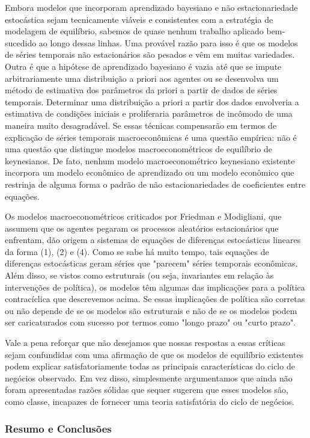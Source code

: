 \documentclass[a4paper,12pt]{article}[abntex2]
\begin{document}
Embora modelos que incorporam aprendizado bayesiano e não estacionariedade estocástica sejam tecnicamente viáveis e consistentes com a estratégia de modelagem de equilíbrio, sabemos de quase nenhum trabalho aplicado bem-sucedido ao longo dessas linhas. Uma provável razão para isso é que os modelos de séries temporais não estacionários são pesados e vêm em muitas variedades. Outra é que a hipótese de aprendizado bayesiano é vazia até que se impute arbitrariamente uma distribuição a priori aos agentes ou se desenvolva um método de estimativa dos parâmetros da priori a partir de dados de séries temporais. Determinar uma distribuição a priori a partir dos dados envolveria a estimativa de condições iniciais e proliferaria parâmetros de incômodo de uma maneira muito desagradável. Se essas técnicas compensarão em termos de explicação de séries temporais macroeconômicas é uma questão empírica: não é uma questão que distingue modelos macroeconométricos de equilíbrio de keynesianos. De fato, nenhum modelo macroeconométrico keynesiano existente incorpora um modelo econômico de aprendizado ou um modelo econômico que restrinja de alguma forma o padrão de não estacionariedades de coeficientes entre equações.

Os modelos macroeconométricos criticados por Friedman e Modigliani, que assumem que os agentes pegaram os processos aleatórios estacionários que enfrentam, dão origem a sistemas de equações de diferenças estocásticas lineares da forma (1), (2) e (4). Como se sabe há muito tempo, tais equações de diferenças estocásticas geram séries que "parecem" séries temporais econômicas. Além disso, se vistos como estruturais (ou seja, invariantes em relação às intervenções de política), os modelos têm algumas das implicações para a política contracíclica que descrevemos acima. Se essas implicações de política são corretas ou não depende de se os modelos são estruturais e não de se os modelos podem ser caricaturados com sucesso por termos como "longo prazo" ou "curto prazo".

Vale a pena reforçar que não desejamos que nossas respostas a essas críticas sejam confundidas com uma afirmação de que os modelos de equilíbrio existentes podem explicar satisfatoriamente todas as principais características do ciclo de negócios observado. Em vez disso, simplesmente argumentamos que ainda não foram apresentadas razões sólidas que sequer sugerem que esses modelos são, como classe, incapazes de fornecer uma teoria satisfatória do ciclo de negócios.

\subsubsection{\textbf{Resumo e Conclusões}}
\end{document}
